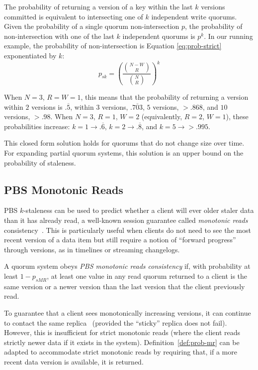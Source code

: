 \documentclass{vldb}
\newcommand{\subsectionskip}{-0em}
\begin{document}
The probability of returning a version of a key within the last $k$
versions committed is equivalent to intersecting one of $k$
independent write quorums.  Given the probability of a single quorum
non-intersection $p$, the probability of non-intersection with one of
the last $k$ independent quorums is $p^k$.  In our running example, the probability of non-intersection is Equation
\ref{eq:prob-strict} exponentiated by $k$:
\begin{equation}
\label{eq:k-consistency}
p_{sk} = \left(\frac{{N-W \choose R}}{{N \choose R}}\right)^k
\end{equation}

When $N$$=$$3$, $R$$=$$W$$=$$1$, this means that the probability of
returning a version within $2$ versions is $.\overline{5}$, within $3$
versions, $.\overline{703}$, $5$ versions, $> .868$, and $10$
versions, $>.98$.  When $N$$=$$3$, $R$$=$$1$, $W$$=$$2$ (equivalently,
$R$$=$$2$, $W$$=$$1$), these probabilities increase: $k$$=$$1
\rightarrow .\overline{6}$, $k$$=$$2 \rightarrow .\overline{8}$, and
$k$$=$$5 \rightarrow > .995$.

This closed form solution holds for quorums that do not change size
over time.  For expanding partial quorum systems, this solution is an
upper bound on the probability of staleness.

\vspace{\subsectionskip}\subsection{PBS Monotonic Reads}

PBS $k$-staleness can be used to predict whether a client will ever
older staler data than it has already read, a well-known session
guarantee called \textit{monotonic reads}
consistency~\cite{sessionguarantees}.  This is particularly useful
when clients do not need to see the most recent version of a data item
but still require a notion of ``forward progress'' through versions,
as in timelines or streaming changelogs.

\begin{definition}
\label{def:prob-mr}
A quorum system obeys \textit{PBS monotonic reads consistency} if,
with probability at least $1-p_{sMR}$, at least one value in any
read quorum returned to a client is the same version or a newer
version than the last version that the client previously read.
\end{definition}

To guarantee that a client sees monotonically increasing versions, it
can continue to contact the same replica~\cite{vogels-defs} (provided
the ``sticky'' replica does not fail).  However, this is insufficient
for strict monotonic reads (where the client reads strictly newer data
if it exists in the system).  Definition~\ref{def:prob-mr} can be
adapted to accommodate strict monotonic reads by requiring that, if a
more recent data version is available, it is returned.
\end{document}
